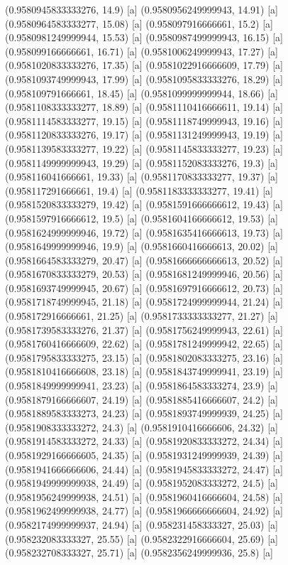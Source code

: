 {{{(0.9580945833333276, 14.9) [a] 
(0.9580956249999943, 14.91) [a] 
(0.9580964583333277, 15.08) [a] 
(0.958097916666661, 15.2) [a] 
(0.9580981249999944, 15.53) [a] 
(0.9580987499999943, 16.15) [a] 
(0.958099166666661, 16.71) [a] 
(0.9581006249999943, 17.27) [a] 
(0.9581020833333276, 17.35) [a] 
(0.9581022916666609, 17.79) [a] 
(0.9581093749999943, 17.99) [a] 
(0.9581095833333276, 18.29) [a] 
(0.958109791666661, 18.45) [a] 
(0.9581099999999944, 18.66) [a] 
(0.9581108333333277, 18.89) [a] 
(0.9581110416666611, 19.14) [a] 
(0.9581114583333277, 19.15) [a] 
(0.9581118749999943, 19.16) [a] 
(0.9581120833333276, 19.17) [a] 
(0.9581131249999943, 19.19) [a] 
(0.9581139583333277, 19.22) [a] 
(0.9581145833333277, 19.23) [a] 
(0.9581149999999943, 19.29) [a] 
(0.9581152083333276, 19.3) [a] 
(0.958116041666661, 19.33) [a] 
(0.9581170833333277, 19.37) [a] 
(0.958117291666661, 19.4) [a] 
(0.9581183333333277, 19.41) [a] 
(0.9581520833333279, 19.42) [a] 
(0.9581591666666612, 19.43) [a] 
(0.9581597916666612, 19.5) [a] 
(0.9581604166666612, 19.53) [a] 
(0.9581624999999946, 19.72) [a] 
(0.9581635416666613, 19.73) [a] 
(0.9581649999999946, 19.9) [a] 
(0.9581660416666613, 20.02) [a] 
(0.9581664583333279, 20.47) [a] 
(0.9581666666666613, 20.52) [a] 
(0.9581670833333279, 20.53) [a] 
(0.9581681249999946, 20.56) [a] 
(0.9581693749999945, 20.67) [a] 
(0.9581697916666612, 20.73) [a] 
(0.9581718749999945, 21.18) [a] 
(0.9581724999999944, 21.24) [a] 
(0.958172916666661, 21.25) [a] 
(0.9581733333333277, 21.27) [a] 
(0.9581739583333276, 21.37) [a] 
(0.9581756249999943, 22.61) [a] 
(0.9581760416666609, 22.62) [a] 
(0.9581781249999942, 22.65) [a] 
(0.9581795833333275, 23.15) [a] 
(0.9581802083333275, 23.16) [a] 
(0.9581810416666608, 23.18) [a] 
(0.9581843749999941, 23.19) [a] 
(0.9581849999999941, 23.23) [a] 
(0.9581864583333274, 23.9) [a] 
(0.9581879166666607, 24.19) [a] 
(0.9581885416666607, 24.2) [a] 
(0.9581889583333273, 24.23) [a] 
(0.9581893749999939, 24.25) [a] 
(0.9581908333333272, 24.3) [a] 
(0.9581910416666606, 24.32) [a] 
(0.9581914583333272, 24.33) [a] 
(0.9581920833333272, 24.34) [a] 
(0.9581929166666605, 24.35) [a] 
(0.9581931249999939, 24.39) [a] 
(0.9581941666666606, 24.44) [a] 
(0.9581945833333272, 24.47) [a] 
(0.9581949999999938, 24.49) [a] 
(0.9581952083333272, 24.5) [a] 
(0.9581956249999938, 24.51) [a] 
(0.9581960416666604, 24.58) [a] 
(0.9581962499999938, 24.77) [a] 
(0.9581966666666604, 24.92) [a] 
(0.9582174999999937, 24.94) [a] 
(0.958231458333327, 25.03) [a] 
(0.958232083333327, 25.55) [a] 
(0.9582322916666604, 25.69) [a] 
(0.958232708333327, 25.71) [a] 
(0.9582356249999936, 25.8) [a] 
}}}
